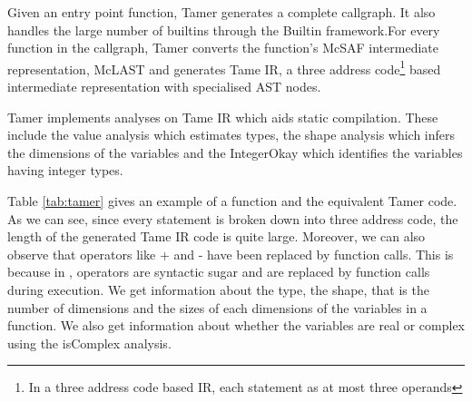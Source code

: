 Given an entry point function, Tamer generates a complete callgraph. It also handles the large number of \matlab builtins through the Builtin framework.For every function in the callgraph, Tamer converts the function's McSAF intermediate representation, McLAST and generates Tame IR, a three address code\footnote{In a three address code based IR, each statement as at most three operands} based intermediate representation with specialised AST nodes. 

Tamer implements analyses on Tame IR which aids static compilation. These include the value analysis\cite{Dubrau:2012} which estimates \matlab types, the shape analysis\cite{Li:2014} which infers the dimensions of the variables and the IntegerOkay\cite{vkumar14} which identifies the variables having integer types. 

Table \ref{tab:tamer} gives an example of a \matlab function and the equivalent Tamer code. As we can see, since every statement is broken down into three address code, the length of the generated Tame IR code is quite large. Moreover, we can also observe that operators like \textsf{+} and \textsf{-} have been replaced by function calls. This is because in \matlab, operators are syntactic sugar and are replaced by function calls during execution. We get information about the type, the shape, that is the number of dimensions and the sizes of each dimensions of the variables in a function. We also get information about whether the variables are real or complex using the isComplex analysis\cite{iscmplx}. 

